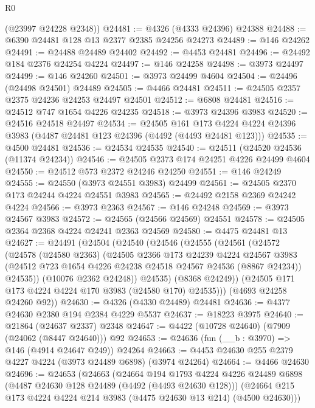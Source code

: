 \begin{lexlean}{R0}
\begin{coremodule}
      (@23997 @24228 @2348))
@24481 := @4326 (@4333 @24396) @24388
@24488 := @6390 @24481 @128 @13 @2377 @2385 @24256 @24273
@24489 := @146 @24262
@24491 := @24488 @24489 @24402
@24492 := @4453 @24481
@24496 := @24492 @184 @2376 @24254 @4224
@24497 := @146 @24258
@24498 := @3973 @24497
@24499 := @146 @24260
@24501 := @3973 @24499 @4604
@24504 := @24496 (@24498 @24501) @24489
@24505 := @4466 @24481
@24511 := @24505 @2357 @2375 @24236 @24253 @24497 @24501
@24512 := @6808 @24481
@24516 := @24512 @747 @1654 @4226 @24235
@24518 := @3973 @24396 @3983
@24520 := @24516 @24518 @24497
@24534 := @24505
    @161
    @173
    @4224
    @4224
    @24396
    @3983
    (@4487 @24481 @123 @24396 (@4492 (@4493 @24481 @123)))
@24535 := @4500 @24481
@24536 := @24534 @24535
@24540 := @24511 (@24520 @24536 (@11374 @24234))
@24546 := @24505 @2373 @174 @24251 @4226 @24499 @4604
@24550 := @24512 @573 @2372 @24246 @24250
@24551 := @146 @24249
@24555 := @24550 (@3973 @24551 @3983) @24499
@24561 := @24505 @2370 @173 @24244 @4224 @24551 @3983
@24565 := @24492 @2158 @2369 @24242 @4224
@24566 := @3973 @2363
@24567 := @146 @24248
@24569 := @3973 @24567 @3983
@24572 := @24565 (@24566 @24569) @24551
@24578 := @24505 @2364 @2368 @4224 @24241 @2363 @24569
@24580 := @4475 @24481 @13
@24627 := @24491
    (@24504
      (@24540
        (@24546
          (@24555
            (@24561
              (@24572
                (@24578
                  (@24580 @2363)
                  (@24505
                    @2366
                    @173
                    @24239
                    @4224
                    @24567
                    @3983
                    (@24512 @723 @1654 @4226 @24238 @24518 @24567 @24536 (@8867 @24234))
                    @24535))
                (@10076 @2362 @24248))
              @24535)
            (@8368 @24249))
          (@24505 @171 @173 @4224 @4224 @170 @3983 (@24580 @170) @24535)))
      (@4693 @24258 @24260 @92))
@24630 := @4326 (@4330 @24489) @24481
@24636 := @4377 @24630 @2380 @194 @2384 @4229 @5537
@24637 := @18223 @3975
@24640 := @21864 (@24637 @2337) @2348
@24647 := @4422 (@10728 @24640) (@7909 (@24062 (@8447 @24640))) @92
@24653 := @24636 (fun (__b : @3970) => @146 (@4914 @24647 @249)) @24264
@24663 := @4453 @24630 @255 @2379 @4227 @4224 (@3973 @24489 @6898) (@3974 @24264)
@24664 := @4466 @24630
@24696 := @24653
    (@24663
      (@24664
        @194
        @1793
        @4224
        @4226
        @24489
        @6898
        (@4487 @24630 @128 @24489 (@4492 (@4493 @24630 @128)))
        (@24664 @215 @173 @4224 @4224 @214 @3983 (@4475 @24630 @13 @214) (@4500 @24630)))

\end{coremodule}
\end{lexlean}
